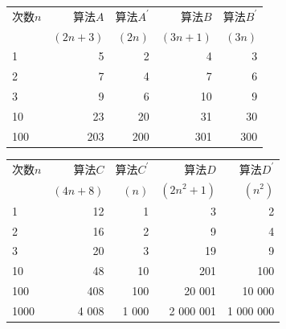 \begin{frame}
      
  \pause 

  \begin{table}
    \begin{tabular}{|l|r|r|r|r|}\hline
      次数$n$&算法$A$&算法$A^\prime$&算法$B$&算法$B^\prime$\\
      & $(2n+3)$&$(2n)$&$(3n+1)$&$(3n)$\\\hline
      1  &  5&  2&  4&  3\\\hline
      2  &  7&  4&  7&  6\\\hline
      3  &  9&  6& 10&  9\\\hline
      10 & 23& 20& 31& 30\\\hline
      100&203&200&301&300\\\hline      
    \end{tabular}
  \end{table}
\end{frame}


\begin{frame}
  \begin{table}
    \begin{tabular}{|l|r|r|r|r|}\hline
      次数$n$&算法$C$&算法$C^\prime$&算法$D$&算法$D^\prime$\\
      & $(4n+8)$&$(n)$&$(2n^2+1)$&$(n^2)$\\\hline
      1   &   12&    1&        3&        2\\\hline
      2   &   16&    2&        9&        4\\\hline
      3   &   20&    3&       19&        9\\\hline
      10  &   48&   10&      201&      100\\\hline
      100 &  408&  100&   20 001&   10 000\\\hline
      1000&4 008&1 000&2 000 001&1 000 000\\\hline      
    \end{tabular}
  \end{table}
  \pause
      
  

\end{frame}


